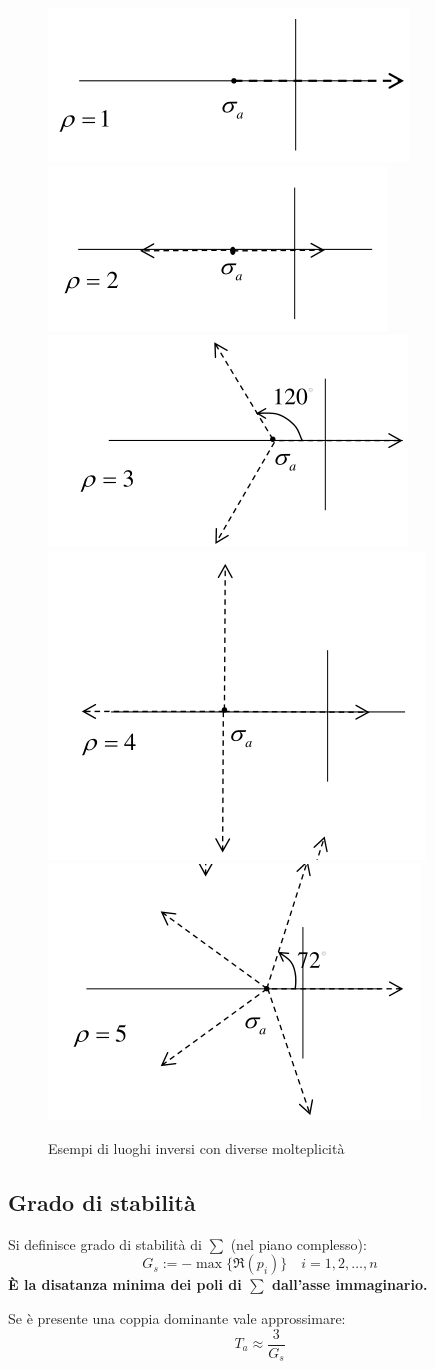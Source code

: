 \begin{figure}[h!]
  \centering
  \includegraphics[width=0.3\linewidth]{./images/luogo_inverso_rho_1.png}
  \includegraphics[width=0.3\linewidth]{./images/luogo_inverso_rho_2.png}
  \includegraphics[width=0.3\linewidth]{./images/luogo_inverso_rho_3.png}
  \includegraphics[width=0.3\linewidth]{./images/luogo_inverso_rho_4.png}
  \includegraphics[width=0.3\linewidth]{./images/luogo_inverso_rho_5.png}
  \caption{Esempi di luoghi inversi con diverse molteplicità}
  \label{fig:luogo_inverso}
\end{figure}


\newpage
\subsection{Grado di stabilità}
\begin{definition}
  Si definisce grado di stabilità di $\sum$ (nel piano complesso):
  \begin{equation}
    G_s := - \max \{ \Re (p_i) \} \quad i = 1,2,\dots,n
  \end{equation}
\textbf{  È la disatanza minima dei poli di $\sum$ dall'asse immaginario.}

Se è presente una coppia dominante vale approssimare:
\begin{equation}
  T_a \approx \frac{3}{G_s}
\end{equation}
\end{definition}


